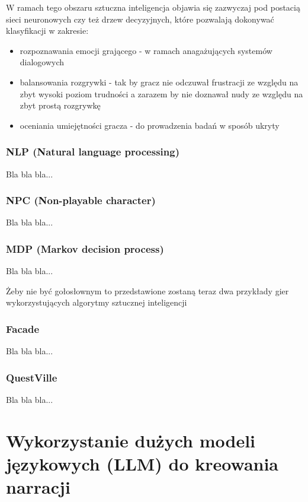 W ramach tego obszaru sztuczna inteligencja objawia się zazwyczaj pod postacią sieci neuronowych czy
też drzew decyzyjnych, które pozwalają dokonywać klasyfikacji w zakresie\cite{reusable_game_ai}:

\begin{itemize}
    \item rozpoznawania emocji grającego - w ramach anagażujących systemów dialogowych
    \item balansowania rozgrywki - tak by gracz nie odczuwał frustracji ze względu na zbyt wysoki poziom
          trudności a zarazem by nie doznawał nudy ze względu na zbyt prostą rozgrywkę
    \item oceniania umiejętności gracza - do prowadzenia badań w sposób ukryty
\end{itemize}

\subsubsection*{NLP (Natural language processing)}

Bla bla bla...

\subsubsection*{NPC (Non-playable character)}

Bla bla bla...

\subsubsection*{MDP (Markov decision process)}

Bla bla bla...

Żeby nie być gołosłownym to przedstawione zostaną teraz dwa przykłady gier wykorzystujących
algorytmy sztucznej inteligencji

\subsubsection*{Facade}

Bla bla bla...

\subsubsection*{QuestVille}

Bla bla bla...

\section{Wykorzystanie dużych modeli językowych (LLM) do kreowania narracji}\label{section:ch2_2}

